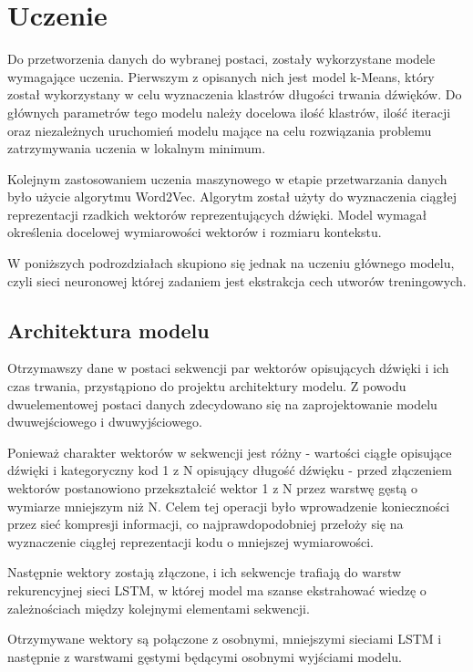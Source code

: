 \chapter{Uczenie} 
{
    Do przetworzenia danych do wybranej postaci, zostały wykorzystane modele wymagające uczenia.
    Pierwszym z opisanych nich jest model k-Means, który został wykorzystany w celu wyznaczenia klastrów
    długości trwania dźwięków. Do głównych parametrów tego modelu należy docelowa ilość klastrów, ilość iteracji
    oraz niezależnych uruchomień modelu mające na celu rozwiązania problemu zatrzymywania uczenia w lokalnym minimum.
    
    Kolejnym zastosowaniem uczenia maszynowego w etapie przetwarzania danych było użycie algorytmu Word2Vec. Algorytm 
    został użyty do wyznaczenia ciągłej reprezentacji rzadkich wektorów reprezentujących dźwięki. Model wymagał 
    określenia docelowej wymiarowości wektorów i rozmiaru kontekstu. 

    W poniższych podrozdziałach skupiono się jednak na uczeniu głównego modelu, czyli sieci neuronowej której
    zadaniem jest ekstrakcja cech utworów treningowych.

    \section{Architektura modelu}
    {
        Otrzymawszy dane w postaci sekwencji par wektorów opisujących dźwięki i ich czas trwania,
        przystąpiono do projektu architektury modelu. Z powodu dwuelementowej postaci danych
        zdecydowano się na zaprojektowanie modelu dwuwejściowego i dwuwyjściowego.

        Ponieważ charakter wektorów w sekwencji jest różny - wartości ciągłe opisujące dźwięki i 
        kategoryczny kod 1 z N opisujący długość dźwięku - przed złączeniem wektorów postanowiono 
        przekształcić wektor 1 z N przez warstwę gęstą o wymiarze mniejszym niż N. Celem tej operacji
        było wprowadzenie konieczności przez sieć kompresji informacji, co najprawdopodobniej przełoży się 
        na wyznaczenie ciągłej reprezentacji kodu o mniejszej wymiarowości. 

        Następnie wektory zostają złączone, i ich sekwencje trafiają do warstw rekurencyjnej sieci LSTM,
        w której model ma szanse ekstrahować wiedzę o zależnościach między kolejnymi elementami sekwencji.

        Otrzymywane wektory są połączone z osobnymi, mniejszymi sieciami LSTM i następnie z warstwami 
        gęstymi będącymi osobnymi wyjściami modelu.
        
}}
